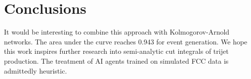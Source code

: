 \section{Conclusions}\label{sec:conclusions}

It would be interesting to combine this approach with Kolmogorov-Arnold
networks. The area under the curve reaches 0.943 for event generation.
We hope this work inspires further research into semi-analytic cut
integrals of trijet production. The treatment of AI agents trained on
simulated FCC data is admittedly heuristic.

